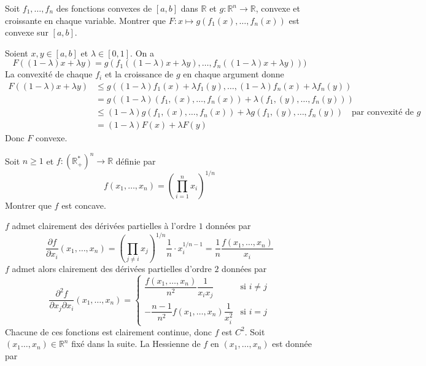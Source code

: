 \documentclass{fancybook}
\begin{document}
\begin{exercice}
Soit $f_1,\ldots, f_n$ des fonctions convexes de $[a,b]$ dans $\mathbb R$ et $g:\mathbb R^n \to \mathbb R$, convexe et croissante en chaque variable.\newline
Montrer que $F:x\mapsto g(f_1(x),\ldots,f_n(x))$ est convexe sur $[a,b]$.
\end{exercice}
Soient $x,y\in [a,b]$ et $\lambda\in [0,1]$. On a $$F((1-\lambda)x + \lambda y)=g(f_1((1-\lambda)x + \lambda y),\ldots, f_n((1-\lambda)x + \lambda y))) $$
La convexité de chaque $f_i$ et la croissance de $g$ en chaque argument donne $$\begin{aligned}F((1-\lambda)x + \lambda y)&\leq g((1-\lambda)f_1(x) + \lambda f_1(y),\ldots,(1-\lambda)f_n(x) + \lambda f_n(y)) \\
&=g((1-\lambda) (f_1,(x),\ldots, f_n(x)) + \lambda (f_1,(y),\ldots, f_n(y)) )\\
&\leq (1-\lambda) g(f_1,(x),\ldots, f_n(x)) + \lambda g(f_1,(y),\ldots, f_n(y)) \quad \text{par convexité de } g\\
&= (1-\lambda) F(x) + \lambda F(y)
\end{aligned}
$$
Donc $F$ convexe.

\begin{exercice}
Soit $n\geq 1$ et $f:(\mathbb R^*_+)^n\to \mathbb R$ définie par $$f(x_1,\ldots, x_n)=\left(\prod_{i=1}^n x_i \right) ^{1/n}$$
Montrer que $f$ est concave.
\end{exercice}
$f$ admet clairement des dérivées partielles à l'ordre $1$ données par $$\dfrac{\partial f}{\partial x_i}(x_1,\ldots,x_n)=\left( \prod_{j\neq i} x_j\right)^{1/n}\dfrac{1}{n}\cdot x_i^{ 1/n -1}=\dfrac{1}{n}\dfrac{f(x_1,\ldots,x_n)}{x_i}$$
$f$ admet alors clairement des dérivées partielles d'ordre $2$ données par 
$$\dfrac{\partial^2 f}{\partial x_j \partial x_i}(x_1,\ldots, x_n) = \begin{cases}
\dfrac{f(x_1,\ldots,x_n)}{n^2} \dfrac 1{x_i x_j} &\text {si }i\neq j \\
-\dfrac{n-1}{n^2}f(x_1,\ldots,x_n)\dfrac{1}{x_i^2} &\text {si } i=j
\end{cases}$$
Chacune de ces fonctions est clairement continue, donc $f$ est $C^2$.\newline
Soit $(x_1\ldots,x_n)\in \mathbb R^n$ fixé dans la suite. La Hessienne de $f$ en $(x_1,\ldots, x_n)$ est donnée par 
\end{document}
